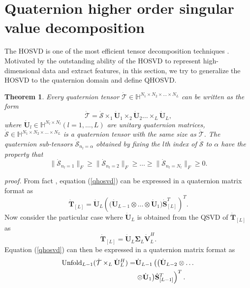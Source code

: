 \documentclass[journal]{IEEEtran}
\newtheorem{theorem}{Theorem}
\begin{document}
\section{Quaternion higher order singular value decomposition}
\label{sec:qhosvd}
The HOSVD is one of the most efficient tensor decomposition techniques \cite{DBLP:journals/siammax/LathauwerMV00}. Motivated by the outstanding ability of the HOSVD to represent high-dimensional data and extract features, in this section, we try to generalize the HOSVD to the quaternion domain and define QHOSVD.

\begin{theorem} Every quaternion tensor $\dot{\mathcal{T}}\in\mathbb{H}^{N_{1}\times N_{2} \times\ldots \times N_{L}}$ can be written as the form
\begin{equation}
\label{qhosvd}
\dot{\mathcal{T}}=\dot{\mathcal{S}}\times_{1}\dot{\mathbf{U}}_{1}\times_{2}\dot{\mathbf{U}}_{2}\ldots\times_{L}\dot{\mathbf{U}}_{L},
\end{equation}	
where $\dot{\mathbf{U}}_{l}\in\mathbb{H}^{N_{l}\times N_{l}} (l=1,\ldots, L)$ are unitary quaternion matrices, $\dot{\mathcal{S}}\in\mathbb{H}^{N_{1}\times N_{2} \times\ldots \times N_{L}}$ is a quaternion tensor with the same size as $\dot{\mathcal{T}}$. The quaternion sub-tensors $\dot{\mathcal{S}}_{n_{l}=\alpha}$ obtained by fixing the $l$th index of $\dot{\mathcal{S}}$ to $\alpha$ have the property that
\begin{equation}\label{order0}
\|\dot{\mathcal{S}}_{n_{l}=1}\|_{F}\geq\|\dot{\mathcal{S}}_{n_{l}=2}\|_{F}\geq\ldots\geq\|\dot{\mathcal{S}}_{n_{l}=N_{l}}\|_{F}\geq 0.
\end{equation}
\end{theorem}
\textit{proof.}
From fact , equation (\ref{qhosvd}) can be expressed in a quaternion matrix format as
\begin{equation}
\label{ul}
\dot{\mathbf{T}}_{[L]}=\dot{\mathbf{U}}_{L}\left(\big(\dot{\mathbf{U}}_{L-1}\otimes\ldots\otimes\dot{\mathbf{U}}_{1}\big)\dot{\mathbf{S}}_{[L]}^{T}\right)^{T}.
\end{equation}
Now consider the particular case where $\dot{\mathbf{U}}_{L}$ is obtained from the QSVD of $\dot{\mathbf{T}}_{[L]}$ as
\begin{equation}\label{ulsvd}
\dot{\mathbf{T}}_{[L]}=\dot{\mathbf{U}}_{L}\mathbf{\Sigma}_{L}\dot{\mathbf{V}}_{L}^{H}.
\end{equation}
 Equation (\ref{qhosvd}) can then be expressed in a quaternion matrix format as 
\begin{equation}
\label{ul-1}
\begin{split}
{\rm{Unfold}}_{L-1}(\dot{\mathcal{T}}\times_{L}\dot{\mathbf{U}}_{L}^{H})=&\dot{\mathbf{U}}_{L-1}\left(\big(\dot{\mathbf{U}}_{L-2}\otimes\ldots\right.\\
&\left.\otimes\dot{\mathbf{U}}_{1}\big)\dot{\mathbf{S}}_{[L-1]}^{T}\right)^{T}.
\end{split}
\end{equation}
\end{document}
